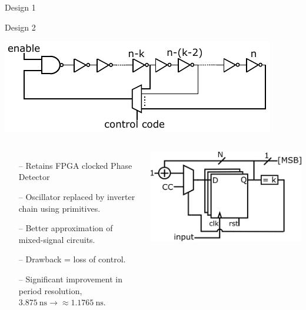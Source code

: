 \documentclass{beamer}
\begin{document}
\begin{frame}{Design 1}
\end{frame}

\begin{frame}{Design 2}
	\vspace{-0.67 cm}	
	\begin{center}
		\includegraphics[width=0.8\linewidth]{../ro_new}
	\end{center}
	\vspace{-0.37 cm}
	\begin{columns}
		\begin{itemize}
			\item[--]
				Retains FPGA clocked Phase Detector
			\item[--]
				Oscillator replaced by inverter chain using primitives.
			\item[--]
				Better approximation of mixed-signal circuits.
			\item[--]
				Drawback = loss of control.
			\item[--]
				Significant improvement in period resolution, $3.875~\si{\nano\second}\rightarrow \approx 1.1765~\si{\nano\second}$.
		\end{itemize}
		\includegraphics[width=\linewidth]{../osc1}
	\end{columns}
\end{frame}
\end{document}
